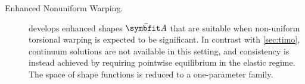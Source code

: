 \begin{description}
\item[Enhanced Nonuniform Warping.]
 develops enhanced shapes \(\EnhanShapes\) that are suitable when non-uniform torsional warping is expected to be significant.
In contrast with \cref{sec:timo}, continuum solutions are not available in this setting, and consistency is instead achieved by requiring pointwise equilibrium in the elastic regime. The space of shape functions is reduced to a one-parameter family. 
\end{description}






